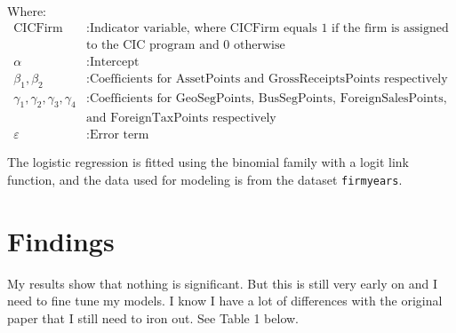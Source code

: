 \documentclass{article}
\begin{document}
Where:
\begin{align*}
\text{CICFirm} & : \text{Indicator variable, where CICFirm equals 1 if the firm is assigned} \\
& \text{to the CIC program and 0 otherwise} \\
\alpha & : \text{Intercept} \\
\beta_1, \beta_2 & : \text{Coefficients for AssetPoints and GrossReceiptsPoints respectively} \\
\gamma_1, \gamma_2, \gamma_3, \gamma_4 & : \text{Coefficients for GeoSegPoints, BusSegPoints, ForeignSalesPoints,} \\
& \text{and ForeignTaxPoints respectively} \\
\varepsilon & : \text{Error term}
\end{align*}

The logistic regression is fitted using the binomial family with a logit link function, and the data used for modeling is from the dataset \texttt{firmyears}.

\section{Findings}
My results show that nothing is significant. But this is still very early on and I need to fine tune my models. I know I have a lot of differences with the original paper that I still need to iron out.
See Table 1 below.
\end{document}
